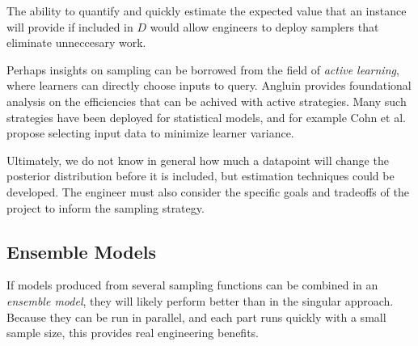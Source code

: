 \documentclass[twoside]{article}
\begin{document}
The ability to quantify and quickly estimate the expected value that an instance will provide if included in \(D\) would allow engineers to deploy samplers that eliminate unneccesary work.

Perhaps insights on sampling can be borrowed from the field of \textit{active learning}, where learners can directly choose inputs to query. Angluin\cite{angluin} provides foundational analysis on the efficiencies that can be achived with active strategies. Many such strategies have been deployed for statistical models, and for example Cohn et al.\cite{active} propose selecting input data to minimize learner variance.

Ultimately, we do not know in general how much a datapoint will change the posterior distribution before it is included, but estimation techniques could be developed. The engineer must also consider the specific goals and tradeoffs of the project to inform the sampling strategy. 

\subsection{Ensemble Models}

If models produced from several sampling functions can be combined in an \textit{ensemble model}, they will likely perform better than in the singular approach. Because they can be run in parallel, and each part runs quickly with a small sample size, this provides real engineering benefits.
\end{document}
